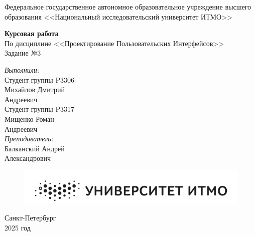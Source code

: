 \documentclass[12pt]{report}
\begin{document}
	
	\begin{titlepage}
		\begin{center}
			\large{Федеральное государственное автономное образовательное учреждение высшего образования <<Национальный исследовательский университет ИТМО>>}
		\end{center}
		
		\vspace{15em}
		
		\begin{center}
			\huge{\textbf{Курсовая работа}} \\
			\large{По дисциплине <<Проектирование Пользовательских Интерфейсов>>} \\
			\large{Задание №3} \\
		\end{center}
		
		\vspace{2em}
		
		\begin{flushright}
			\textit{\large{Выполнили:}} \\
			\large{Студент группы P3306} \\
			\large{Михайлов Дмитрий} \\
			\large{Андреевич} \\
			\large{Студент группы P3317} \\
			\large{Мищенко Роман} \\
			\large{Андреевич} \\
			\textit{\large{Преподаватель:}} \\
			\large{Балканский Андрей} \\
			\large{Александрович}
		\end{flushright}
		
		\vspace{2cm}
		
		\begin{figure}[h]
			\centering
			\includegraphics[width=0.5\linewidth]{image.png}
		\end{figure}
		
		\begin{center}
			Санкт-Петербург \\
			2025 год
		\end{center}
	\end{titlepage}
	
	\tableofcontents
	\newpage
	
\end{document}
